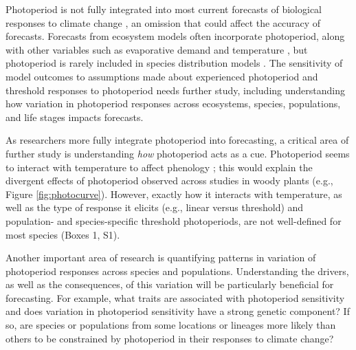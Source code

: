 \documentclass{article}
\begin{document}
\par Photoperiod is not fully integrated into most current forecasts of biological responses to climate change \citep[but see][]{tobin2008}, an omission that could affect the accuracy of forecasts. Forecasts from ecosystem models often incorporate photoperiod, along with other variables such as evaporative demand and temperature \citep [e.g., ED] []{jolly2005,medvigy2013}, but photoperiod is rarely included in species distribution models \citep [e.g.,] []{morin2009,zhu2012}. The sensitivity of model outcomes to assumptions made about experienced photoperiod and threshold responses to photoperiod needs further study, including understanding how variation in photoperiod responses across ecosystems, species, populations, and life stages impacts forecasts. 

\par As researchers more fully integrate photoperiod into forecasting, a critical area of further study is understanding \emph{how} photoperiod acts as a cue. Photoperiod seems to interact with temperature to affect phenology \citep[e.g., ][]{zydlewski2014}; this would explain the divergent effects of photoperiod observed across studies in woody plants (e.g., Figure \ref{fig:photocurve}). However, exactly how it interacts with temperature, as well as the type of response it elicits (e.g., linear versus threshold) and population- and species-specific threshold photoperiods, are not well-defined for most species (Boxes 1, S1).  

\par Another important area of research is quantifying patterns in variation of photoperiod responses across species and populations. Understanding the drivers, as well as the consequences, of this variation will be particularly beneficial for forecasting. For example, what traits are associated with photoperiod sensitivity and does variation in photoperiod sensitivity have a strong genetic component? If so, are species or populations from some locations or lineages more likely than others to be constrained by photoperiod in their responses to climate change?
\end{document}

